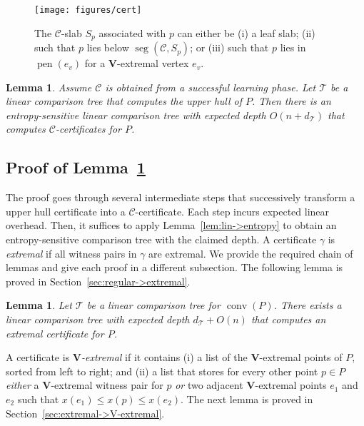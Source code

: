 \documentclass[letterpaper,11pt]{article}
\newtheorem{lemma}[theorem]{Lemma}
\DeclareMathOperator{\UH}{conv}
\DeclareMathOperator{\seg}{seg}
\DeclareMathOperator{\pen}{pen}
\newcommand{\cC}{\mathcal{C}}
\newcommand{\cT}{\mathcal{T}}
\begin{document}
\begin{figure}
  \centering
  \texttt{[image: figures/cert]} 
  \caption{The $\cC$-slab $S_p$ associated
    with $p$ can either be (i) a leaf slab; (ii) such
    that $p$ lies below $\seg(\cC, S_p)$; or (iii)
    such that $p$ lies in $\pen(e_v)$
    for a $\textbf{V}$-extremal vertex $e_v$.}
\label{fig:cert}
\end{figure}

\begin{lemma}\label{lem:entropy-sensitive-CH}
  Assume $\cC$ is obtained from a successful 
  learning phase. Let $\cT$ be 
  a linear comparison tree that computes 
  the upper hull of $P$. Then there is 
  an entropy-sensitive linear comparison tree 
  with expected depth $O(n + d_{\cT})$ that computes 
  $\cC$-certificates for $P$. 
\end{lemma}

\subsection{Proof of Lemma~\ref{lem:entropy-sensitive-CH}}
\label{sec:certificate}

The proof goes through several 
intermediate steps that successively 
transform a upper hull certificate 
into a $\cC$-certificate. 
Each step incurs expected linear 
overhead. Then, it suffices to 
apply Lemma~\ref{lem:lin->entropy} to obtain an
entropy-sensitive comparison tree with 
the claimed depth.
A certificate $\gamma$ is \emph{extremal} 
if all witness pairs in 
$\gamma$ are extremal. We provide the
required chain 
of lemmas and
give each proof in a different subsection.
The following lemma is proved in 
Section~\ref{sec:regular->extremal}.

\begin{lemma}\label{lem:regular->extremal}
  Let $\cT$ be a linear comparison tree 
  for $\UH(P)$. There exists a linear 
  comparison tree with expected depth 
  $d_\cT + O(n)$ that computes an 
  extremal certificate for $P$.
\end{lemma}

A certificate is 
\emph{\textup{$\textbf{V}$}-extremal} if 
it contains (i) a list of the 
$\textbf{V}$-extremal points of $P$, sorted 
from left to right; and (ii) a list that stores 
for every other point $p \in P$ \emph{either} 
a $\textbf{V}$-extremal witness pair
for $p$ \emph{or} two adjacent 
$\textbf{V}$-extremal points $e_1$ and $e_2$ such 
that $x(e_1) \leq x(p) \leq x(e_2)$. The next 
lemma is proved in 
Section~\ref{sec:extremal->V-extremal}.
\end{document}

